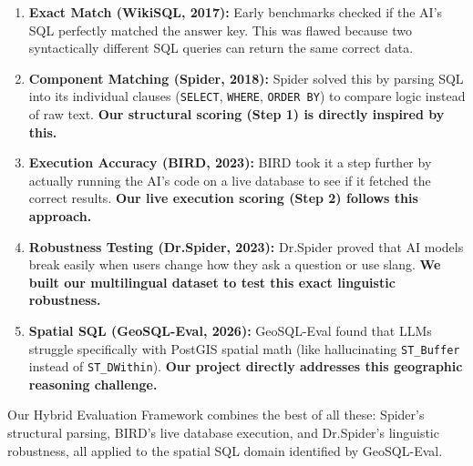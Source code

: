 \documentclass[11pt,a4paper]{article}
\begin{document}
\begin{enumerate}
    \item \textbf{Exact Match (WikiSQL, 2017):} Early benchmarks \cite{zhong2017wikisql} checked if the AI's SQL perfectly matched the answer key. This was flawed because two syntactically different SQL queries can return the same correct data.
    
    \item \textbf{Component Matching (Spider, 2018):} Spider \cite{yu2018spider} solved this by parsing SQL into its individual clauses (\texttt{SELECT}, \texttt{WHERE}, \texttt{ORDER BY}) to compare logic instead of raw text. \textbf{Our structural scoring (Step 1) is directly inspired by this.}
    
    \item \textbf{Execution Accuracy (BIRD, 2023):} BIRD \cite{li2023bird} took it a step further by actually running the AI's code on a live database to see if it fetched the correct results. \textbf{Our live execution scoring (Step 2) follows this approach.}
    
    \item \textbf{Robustness Testing (Dr.Spider, 2023):} Dr.Spider \cite{chang2023drspider} proved that AI models break easily when users change how they ask a question or use slang. \textbf{We built our multilingual dataset to test this exact linguistic robustness.}
    
    \item \textbf{Spatial SQL (GeoSQL-Eval, 2026):} GeoSQL-Eval \cite{jiao2026geosql} found that LLMs struggle specifically with PostGIS spatial math (like hallucinating \texttt{ST\_Buffer} instead of \texttt{ST\_DWithin}). \textbf{Our project directly addresses this geographic reasoning challenge.}
\end{enumerate}

\noindent Our Hybrid Evaluation Framework combines the best of all these: Spider's structural parsing, BIRD's live database execution, and Dr.Spider's linguistic robustness, all applied to the spatial SQL domain identified by GeoSQL-Eval.
\end{document}
